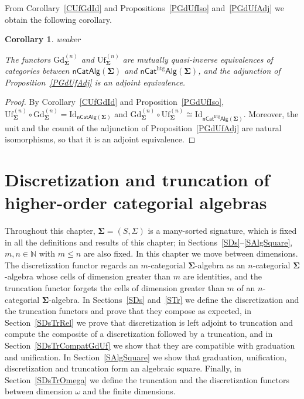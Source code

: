 \documentclass[a4paper, reqno]{amsbook}
\makeatletter
\newcommand{\sig}[1]{\mathbf{#1}}             %
\newcommand{\htg}{\mathrm{htg}}                %
\newcommand{\Id}{\mathrm{Id}}
\newcommand{\Gd}{\mathrm{Gd}}
\newcommand{\Uf}{\mathrm{Uf}}
\theoremstyle{plain}
\newtheorem{corollary}[theorem]{Corollary}
\theoremstyle{definition}
\newcommand*{\CA@leanpending}{}
\newcommand*{\CA@leanrelation}{}
\newcommand*{\lean}[2]{%
  \ifcsname\string\color@lean@#1\endcsname\else
    \PackageError{main}{Unknown relation `#1' in \string\lean}{Use equivalent, weaker or stronger.}%
  \fi
  \gdef\CA@leanrelation{#1}%
  \gdef\CA@leanpending{#2}}
\makeatother
\begin{document}
From Corollary~\ref{CUfGdId} and Propositions~\ref{PGdUfIso} and~\ref{PGdUfAdj} we obtain the following corollary.

\begin{corollary}\label{CGdUfEquiv}\lean{weaker}{Presentations.presentationEquivalence}
The functors $\Gd^{(n)}_{\sig{\Sigma}}$ and $\Uf^{(n)}_{\sig{\Sigma}}$ are mutually quasi-inverse equivalences of categories between $\mathsf{nCatAlg}(\sig{\Sigma})$ and $\mathsf{nCat}^{\htg}\mathsf{Alg}(\sig{\Sigma})$, and the adjunction of Proposition~\ref{PGdUfAdj} is an adjoint equivalence.
\end{corollary}
\begin{proof}
By Corollary~\ref{CUfGdId} and Proposition~\ref{PGdUfIso}, $\Uf^{(n)}_{\sig{\Sigma}}\circ\Gd^{(n)}_{\sig{\Sigma}}=\Id_{\mathsf{nCatAlg}(\sig{\Sigma})}$ and $\Gd^{(n)}_{\sig{\Sigma}}\circ\Uf^{(n)}_{\sig{\Sigma}}\cong\Id_{\mathsf{nCat}^{\htg}\mathsf{Alg}(\sig{\Sigma})}$.
Moreover, the unit and the counit of the adjunction of Proposition~\ref{PGdUfAdj} are natural isomorphisms, so that it is an adjoint equivalence.
\end{proof}

\chapter[Discretization and truncation]{Discretization and truncation of higher-order categorial algebras}\label{SDsTr}

Throughout this chapter, $\sig{\Sigma}=(S,\Sigma)$ is a many-sorted signature, which is fixed in all the definitions and results of this chapter; in Sections~\ref{SDs}--\ref{SAlgSquare}, $m,n\in\mathbb{N}$ with $m\leq n$ are also fixed.
In this chapter we move between dimensions.
The discretization functor regards an $m$-categorial $\sig{\Sigma}$-algebra as an $n$-categorial $\sig{\Sigma}$-algebra whose cells of dimension greater than $m$ are identities, and the truncation functor forgets the cells of dimension greater than $m$ of an $n$-categorial $\sig{\Sigma}$-algebra.
In Sections~\ref{SDs} and~\ref{STr} we define the discretization and the truncation functors and prove that they compose as expected, in Section~\ref{SDsTrRel} we prove that discretization is left adjoint to truncation and compute the composite of a discretization followed by a truncation, and in Section~\ref{SDsTrCompatGdUf} we show that they are compatible with graduation and unification.
In Section~\ref{SAlgSquare} we show that graduation, unification, discretization and truncation form an algebraic square.
Finally, in Section~\ref{SDsTrOmega} we define the truncation and the discretization functors between dimension $\omega$ and the finite dimensions.
\end{document}
